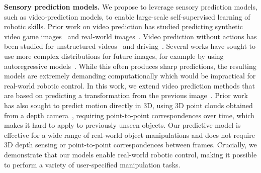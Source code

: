\noindent \textbf{Sensory prediction models.}
We propose to leverage sensory prediction models, such as video-prediction models, to enable large-scale self-supervised learning of robotic skills. Prior work on video prediction has studied predicting synthetic video game images~\cite{atarioh,recurrentsimulators} and real-world images~\cite{bootsetal,finn_nips,video_pixel_networks}. Video prediction without actions has been studied for unstructured videos~\cite{beyond_mse,convlstm,vondrick} and driving~\cite{prednet,dynamic_filter_networks}. Several works have sought to use more complex distributions for future images, for example by using autoregressive models~\cite{video_pixel_networks,scott_reed}. While this often produces sharp predictions, the resulting models are extremely demanding computationally which would be impractical for real-world robotic control. In this work, we extend video prediction methods that are based on predicting a transformation from the previous image~\cite{finn_nips,dynamic_filter_networks}. Prior work has also sought to predict motion directly in 3D, using 3D point clouds obtained from a depth camera~\cite{se3}, requiring point-to-point correspondences over time, which makes it hard to apply to previously unseen objects. Our predictive model is effective for a wide range of real-world object manipulations and does not require 3D depth sensing or point-to-point correspondences between frames. Crucially, we demonstrate that our models enable real-world robotic control, making it possible to perform a variety of user-specified manipulation tasks.

